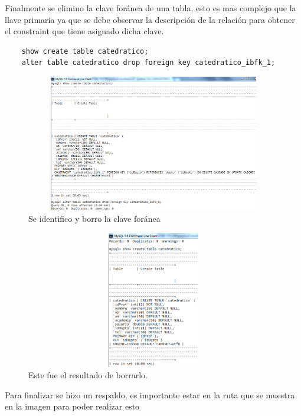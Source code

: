 \documentclass[12pt, titlepage]{article}
\begin{document}
    Finalmente se elimino la clave foránea de una tabla, esto es mas complejo que la llave primaria ya que se debe observar la descripción de la relación para obtener el constraint que tiene asignado dicha clave.
    \begin{lstlisting}
    show create table catedratico;
    alter table catedratico drop foreign key catedratico_ibfk_1;
    \end{lstlisting}
    \begin{figure}[H]
        \begin{center}
            \includegraphics[width=12cm, height=6cm]{img/constraint.png}
            \caption{Se identifico y borro la clave foránea}
            \label{fig:constraint}
        \end{center}
    \end{figure}
\begin{figure}[H]
    \begin{center}
        \includegraphics[width=12cm, height=6cm]{img/constraint2.png}
        \caption{Este fue el resultado de borrarlo.}
        \label{fig:constraint2}
    \end{center}
\end{figure}
    Para finalizar se hizo un respaldo, es importante estar en la ruta que se muestra en la imagen para poder realizar esto
\end{document}

